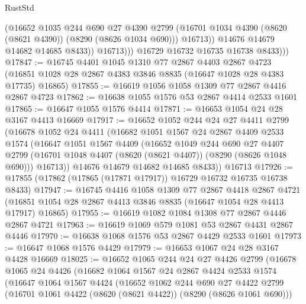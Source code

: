 \begin{lexlean}{RustStd}
\begin{coremodule}
                      (@16652
                        @1035
                        @244
                        @690
                        @27
                        @4390
                        @2799
                        (@16701 @1034 @4390 (@8620 (@8621 @4390)) (@8290 (@8626 @1034 @690)))
                        @16713))
                    @14676
                    @14679
                    @14682
                    @14685
                    @8433))
                @16713)))
          @16729
          @16732
          @16735
          @16738
          @8433)))
@17847 := @16745
    @4401
    @1045
    @1310
    @77
    @2867
    @4403
    @2867
    @4723
    (@16851 @1028 @28 @2867 @4383 @3846 @8835 (@16647 @1028 @28 @4383 @17735) @16865)
@17855 := @16619 @1056 @1058 @1309 @77 @2867 @4416 @2867 @4723
@17862 := @16638 @1055 @1576 @53 @2867 @4414 @2533 @1601
@17865 := @16647 @1055 @1576 @4414
@17871 := @16653 @1054 @24 @28 @3167 @4413 @16669
@17917 := @16652
    @1052
    @244
    @24
    @27
    @4411
    @2799
    (@16678
      @1052
      @24
      @4411
      (@16682
        @1051
        @1567
        @24
        @2867
        @4409
        @2533
        @1574
        (@16647
          @1051
          @1567
          @4409
          (@16652
            @1049
            @244
            @690
            @27
            @4407
            @2799
            (@16701 @1048 @4407 (@8620 (@8621 @4407)) (@8290 (@8626 @1048 @690)))
            @16713))
        @14676
        @14679
        @14682
        @14685
        @8433))
    @16713
@17926 := @17855 (@17862 (@17865 (@17871 @17917)) @16729 @16732 @16735 @16738 @8433)
@17947 := @16745
    @4416
    @1058
    @1309
    @77
    @2867
    @4418
    @2867
    @4721
    (@16851 @1054 @28 @2867 @4413 @3846 @8835 (@16647 @1054 @28 @4413 @17917) @16865)
@17955 := @16619 @1082 @1084 @1308 @77 @2867 @4446 @2867 @4721
@17963 := @16619 @1069 @579 @1081 @53 @2867 @4431 @2867 @4446
@17970 := @16638 @1068 @1576 @53 @2867 @4429 @2533 @1601
@17973 := @16647 @1068 @1576 @4429
@17979 := @16653 @1067 @24 @28 @3167 @4428 @16669
@18025 := @16652
    @1065
    @244
    @24
    @27
    @4426
    @2799
    (@16678
      @1065
      @24
      @4426
      (@16682
        @1064
        @1567
        @24
        @2867
        @4424
        @2533
        @1574
        (@16647
          @1064
          @1567
          @4424
          (@16652
            @1062
            @244
            @690
            @27
            @4422
            @2799
            (@16701 @1061 @4422 (@8620 (@8621 @4422)) (@8290 (@8626 @1061 @690)))

\end{coremodule}
\end{lexlean}
